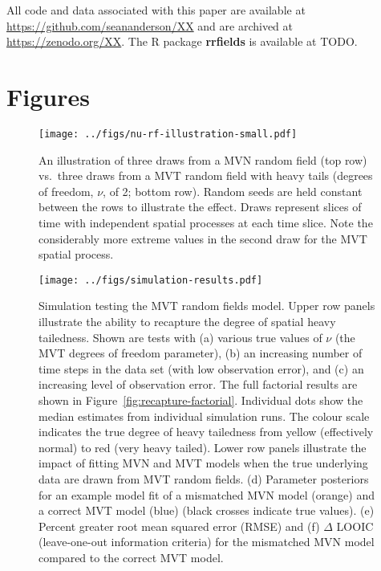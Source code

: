 \documentclass[12pt,english]{article}
\begin{document}
\begin{spacing}{1.3}
All code and data associated with this paper are available at
\url{https://github.com/seananderson/XX} and are archived at
\url{https://zenodo.org/XX}.
The R package \textbf{rrfields} is available at TODO.



\clearpage

\section{Figures}

\begin{figure}[htb]
  \begin{center}
    \texttt{[image: ../figs/nu-rf-illustration-small.pdf]}
    \caption{An illustration of three draws from a MVN random field (top row)
      vs.\ three draws from a MVT random field with heavy tails
      (degrees of freedom, $\nu$, of 2; bottom row). Random seeds are held constant
      between the rows
      to illustrate the effect. Draws represent slices of time with independent spatial
      processes at each time slice. Note the considerably more extreme values in
      the second draw for the MVT spatial process.}
    \label{fig:nu}
  \end{center}
\end{figure}

\clearpage

\begin{figure}[htb]
  \begin{center}
    \texttt{[image: ../figs/simulation-results.pdf]}
    \caption{Simulation testing the MVT random fields model.
      Upper row
      panels illustrate the ability to recapture the
      degree of spatial heavy tailedness.
      Shown are tests with
      (a) various true values of $\nu$ (the MVT degrees of freedom parameter),
      (b) an increasing number of time steps in the data set (with low observation error),
      and (c) an increasing level of observation error.
      The full factorial results are shown in Figure~\ref{fig:recapture-factorial}.
      Individual dots show the median estimates from individual simulation runs.
      The colour scale indicates the true degree of heavy tailedness from
      yellow (effectively normal) to red (very heavy tailed).
      Lower row panels illustrate the impact of fitting MVN and MVT models
      when the true underlying data are drawn from MVT random fields.
      (d) Parameter posteriors for an
      example model fit of a mismatched MVN model (orange)
      and a correct MVT model (blue) (black crosses indicate true values).
      (e) Percent greater root mean squared error (RMSE)
      and (f) $\Delta$ LOOIC (leave-one-out information criteria)
      for the mismatched MVN model compared to the correct MVT model.
    }
    \label{fig:recapture}
  \end{center}
\end{figure}


\end{spacing}
\end{document}
